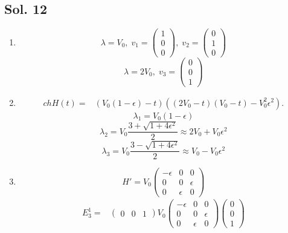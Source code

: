 \subsection*{Sol. 12}
\begin{enumerate}
    \item 
    $$
    \lambda=V_0,\; 
    v_1=\begin{pmatrix}
        1\\0\\0
    \end{pmatrix},\;
    v_2=\begin{pmatrix}
        0\\1\\0
    \end{pmatrix}
    $$
    $$
    \lambda=2V_0,\; 
    v_3=\begin{pmatrix}
        0\\0\\1
    \end{pmatrix}
    $$
    \item 
    \begin{align*}
        chH(t)
        =&(V_0(1-\epsilon)-t)((2V_0-t)(V_0-t)-V_0^2\epsilon^2).
    \end{align*}
    $$
    \lambda_1 = V_0(1-\epsilon)
    $$
    $$
    \lambda_2 = V_0\frac{3+\sqrt{1+4\epsilon^2}}{2} \approx2V_0+V_0\epsilon^2
    $$
    $$
    \lambda_3 = V_0\frac{3-\sqrt{1+4\epsilon^2}}{2}\approx
    V_0-V_0\epsilon^2
    $$
    \item 
    $$
    H'=V_0\begin{pmatrix}
        -\epsilon & 0 & 0\\
        0 & 0 & \epsilon\\
        0 & \epsilon & 0
    \end{pmatrix}
    $$
    \begin{align*}
        E_3^1 =& \begin{pmatrix}
            0 & 0 & 1 
        \end{pmatrix}
        V_0\begin{pmatrix}
        -\epsilon & 0 & 0\\
        0 & 0 & \epsilon\\
        0 & \epsilon & 0
    \end{pmatrix}
    \begin{pmatrix}
            0 \\ 0 \\ 1 
        \end{pmatrix}\\

\end{align*}
\end{enumerate}
